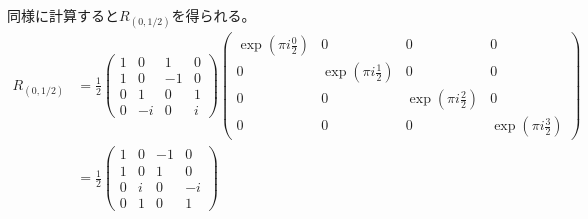 \documentclass[12pt,b5paper]{ltjsarticle}
\begin{document}
\begin{description}
\begin{description}
同様に計算すると$R_{(0,1/2)}$を得られる。
\begin{align}
 R_{(0,1/2)}
  &=
\frac{1}{2}
\begin{pmatrix}
 1 & 0 & 1 & 0 \\
 1 & 0 & -1 & 0 \\
 0 & 1 & 0 & 1 \\
 0 & -i & 0 & i
\end{pmatrix}
 \begin{pmatrix}
  \exp{(\pi i \frac{0}{2})} & 0 & 0 & 0 \\
  0 & \exp{(\pi i \frac{1}{2})} & 0 & 0 \\
  0 & 0 & \exp{(\pi i \frac{2}{2})} & 0 \\
  0 & 0 & 0 & \exp{(\pi i \frac{3}{2})}
 \end{pmatrix}
\\
&=
\frac{1}{2}
\begin{pmatrix}
1 & 0 & -1 & 0 \\
1 & 0 & 1 & 0 \\
0 & i & 0 & -i \\
0 & 1 & 0 & 1
\end{pmatrix}
\end{align}




\end{description}
\end{description}
\end{document}
